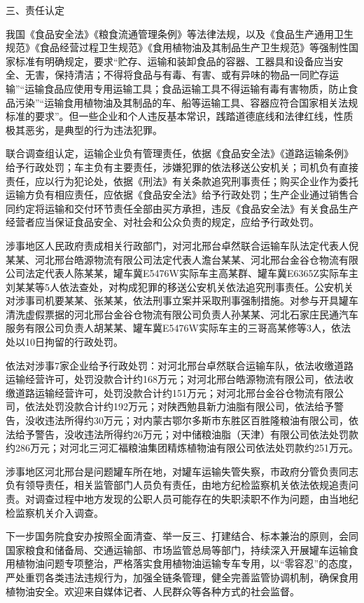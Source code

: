 三、责任认定

我国《食品安全法》《粮食流通管理条例》等法律法规，以及《食品生产通用卫生规范》《食品经营过程卫生规范》《食用植物油及其制品生产卫生规范》等强制性国家标准有明确规定，要求“贮存、运输和装卸食品的容器、工器具和设备应当安全、无害，保持清洁；不得将食品与有毒、有害、或有异味的物品一同贮存运输”“运输食品应使用专用运输工具；食品运输工具不得运输有毒有害物质，防止食品污染”“运输食用植物油及其制品的车、船等运输工具、容器应符合国家相关法规标准的要求”。但一些企业和个人违反基本常识，践踏道德底线和法律红线，性质极其恶劣，是典型的行为违法犯罪。

联合调查组认定，运输企业负有管理责任，依据《食品安全法》《道路运输条例》给予行政处罚；车主负有主要责任，涉嫌犯罪的依法移送公安机关；司机负有直接责任，应以行为犯论处，依据《刑法》有关条款追究刑事责任；购买企业作为委托运输方负有相应责任，应依据《食品安全法》给予行政处罚；生产企业通过销售合同约定将运输和交付环节责任全部由买方承担，违反《食品安全法》有关食品生产经营者应当保证食品安全、对社会和公众负责的规定，应给予行政处罚。

涉事地区人民政府责成相关行政部门，对河北邢台卓然联合运输车队法定代表人倪某某、河北邢台皓源物流有限公司法定代表人澹台某某、河北邢台金谷仓物流有限公司法定代表人陈某某，罐车冀E5476W实际车主高某群、罐车冀E6365Z实际车主刘某某等5人依法查处，对构成犯罪的移送公安机关依法追究刑事责任。公安机关对涉事司机要某某、张某某，依法刑事立案并采取刑事强制措施。对参与开具罐车清洗虚假票据的河北邢台金谷仓物流有限公司负责人孙某某、河北石家庄民通汽车服务有限公司负责人胡某某、罐车冀E5476W实际车主的三哥高某修等3人，依法处以10日拘留的行政处罚。

依法对涉事7家企业给予行政处罚：对河北邢台卓然联合运输车队，依法收缴道路运输经营许可，处罚没款合计约168万元；对河北邢台皓源物流有限公司，依法收缴道路运输经营许可，处罚没款合计约151万元；对河北邢台金谷仓物流有限公司，依法处罚没款合计约192万元；对陕西勉县新力油脂有限公司，依法给予警告，没收违法所得约30万元；对内蒙古鄂尔多斯市东胜区百胜隆粮油有限公司，依法给予警告，没收违法所得约26万元；对中储粮油脂（天津）有限公司依法处罚款约286万元；对河北三河汇福粮油集团精炼植物油有限公司依法处罚款约251万元。

涉事地区河北邢台是问题罐车所在地，对罐车运输失管失察，市政府分管负责同志负有领导责任，相关监管部门人员负有责任，由地方纪检监察机关依法依规追责问责。对调查过程中地方发现的公职人员可能存在的失职渎职不作为问题，由当地纪检监察机关介入调查。

下一步国务院食安办按照全面清查、举一反三、打建结合、标本兼治的原则，会同国家粮食和储备局、交通运输部、市场监管总局等部门，持续深入开展罐车运输食用植物油问题专项整治，严格落实食用植物油运输专车专用，以“零容忍”的态度，严处重罚各类违法违规行为，加强全链条管理，健全完善监管协调机制，确保食用植物油安全。欢迎来自媒体记者、人民群众等各种方式的社会监督。

